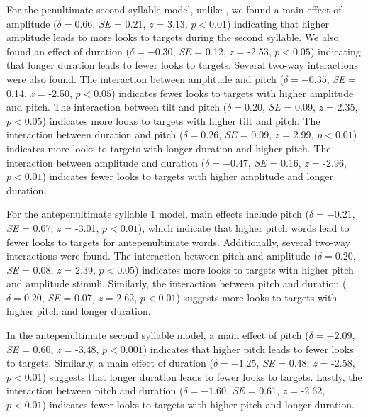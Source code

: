 For the penultimate second syllable model, unlike \cite{Sulpizio_McQueen_2012}, we found a main effect of amplitude ($\delta = 0.66$, \textit{SE} = 0.21, \textit{z} = 3.13, $p < 0.01$) indicating that higher amplitude leads to more looks to targets during the second syllable. We also found an effect of duration ($\delta = -0.30$, \textit{SE} = 0.12, \textit{z} = -2.53, $p < 0.05$) indicating that longer duration leads to fewer looks to targets. Several two-way interactions were also found. The interaction between amplitude and pitch ($\delta = -0.35$, \textit{SE} = 0.14, \textit{z} = -2.50, $p < 0.05$) indicates fewer looks to targets with higher amplitude and pitch. The interaction between tilt and pitch ($\delta = 0.20$, \textit{SE} = 0.09, \textit{z} = 2.35, $p < 0.05$) indicates more looks to targets with higher tilt and pitch. The interaction between duration and pitch ($\delta = 0.26$, \textit{SE} = 0.09, \textit{z} = 2.99, $p < 0.01$) indicates more looks to targets with longer duration and higher pitch. The interaction between amplitude and duration ($\delta = -0.47$, \textit{SE} = 0.16, \textit{z} = -2.96, $p < 0.01$) indicates fewer looks to targets with higher amplitude and longer duration.

For the antepenultimate syllable 1 model, main effects include pitch ($\delta = -0.21$, \textit{SE} = 0.07, \textit{z} = -3.01, $p < 0.01$), which indicate that higher pitch words lead to fewer looks to targets for antepenultimate words. Additionally, several two-way interactions were found. The interaction between pitch and amplitude ($\delta = 0.20$, \textit{SE} = 0.08, \textit{z} = 2.39, $p < 0.05$) indicates more looks to targets with higher pitch and amplitude stimuli. Similarly, the interaction between pitch and duration ($\delta = 0.20$, \textit{SE} = 0.07, \textit{z} = 2.62, $p < 0.01$) suggests more looks to targets with higher pitch and longer duration. 

In the antepenultimate second syllable model, a main effect of pitch ($\delta = -2.09$, \textit{SE} = 0.60, \textit{z} = -3.48, $p < 0.001$) indicates that higher pitch leads to fewer looks to targets. Similarly, a main effect of duration ($\delta = -1.25$, \textit{SE} = 0.48, \textit{z} = -2.58, $p < 0.01$) suggests that longer duration leads to fewer looks to targets. Lastly, the interaction between pitch and duration ($\delta = -1.60$, \textit{SE} = 0.61, \textit{z} = -2.62, $p < 0.01$) indicates fewer looks to targets with higher pitch and longer duration.


